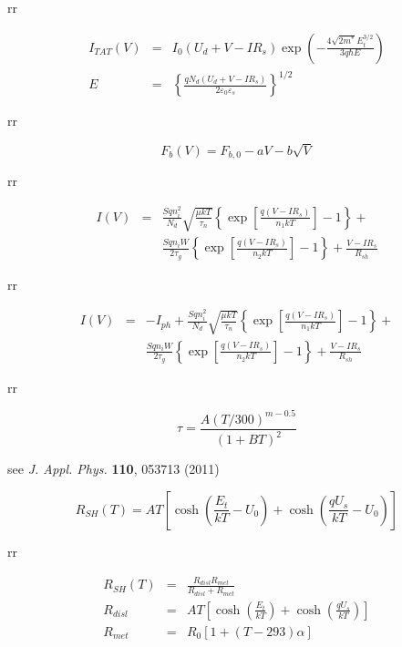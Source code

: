 \documentclass[14pt]{article}
\numberwithin{equation}{part}
\begin{document}
rr

\begin{eqnarray*}
    I_{TAT}(V)&=&I_0(U_d+V-IR_s)\exp\left(-\frac{4\sqrt{2m^*}E_t^{3/2}}{3q\hbar E}\right)\\
    E&=&\left\{\frac{qN_d(U_d+V-IR_s)}{2\varepsilon_0\varepsilon_s}\right\}^{1/2}
\end{eqnarray*}

rr

\begin{equation*}
   F_b(V)=F_{b,0}-a V-b\sqrt{V}
\end{equation*}

rr

\begin{eqnarray*}
  I(V)&=&\frac{Sqn_i^2}{N_d}\sqrt{\frac{\mu k T}{\tau_n}}\left\{\exp \left[\frac{q(V-IR_s)}{n_1kT}\right]-1\right\}+\\
  &&\frac{Sqn_iW}{2\tau_g}\left\{\exp \left[\frac{q(V-IR_s)}{n_2kT}\right]-1\right\}+ \frac{V-IR_s}{R_{sh}}
\end{eqnarray*}


rr

\begin{eqnarray*}
  I(V)&=&-I_{ph}+\frac{Sqn_i^2}{N_d}\sqrt{\frac{\mu k T}{\tau_n}}\left\{\exp \left[\frac{q(V-IR_s)}{n_1kT}\right]-1\right\}+\\
  &&\frac{Sqn_iW}{2\tau_g}\left\{\exp \left[\frac{q(V-IR_s)}{n_2kT}\right]-1\right\}+ \frac{V-IR_s}{R_{sh}}
\end{eqnarray*}


rr

\begin{equation*}
  \tau=\frac{A(T/300)^{m-0.5}}{(1+BT)^2}
\end{equation*}

see \emph{J. Appl. Phys.} \textbf{110}, 053713 (2011)



\begin{equation*}
  R_{SH}(T)=AT\left[\cosh\left(\frac{E_t}{kT}-U_0\right)+\cosh\left(\frac{qU_s}{kT}-U_0\right)\right]
\end{equation*}

rr

\begin{eqnarray*}
    R_{SH}(T)&=&\frac{R_{disl}R_{met}}{R_{disl}+R_{met}}\\
    R_{disl}&=&AT\left[\cosh\left(\frac{E_t}{kT}\right)+\cosh\left(\frac{qU_s}{kT}\right)\right]\\
    R_{met}&=&R_0\left[1+(T-293)\alpha\right]
\end{eqnarray*}
\end{document}
